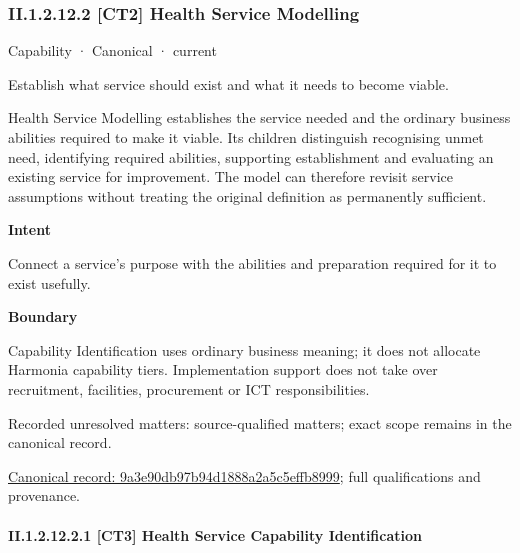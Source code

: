 \subsubsection*{II.1.2.12.2 [CT2] Health Service Modelling}
\label{navigation:II.1.2.12.2}

\label{element:9a3e90db97b94d1888a2a5c5effb8999}
{\small Capability · Canonical · current}\par

Establish what service should exist and what it needs to become viable.



Health Service Modelling establishes the service needed and the ordinary business abilities required to make it viable. Its children distinguish recognising unmet need, identifying required abilities, supporting establishment and evaluating an existing service for improvement. The model can therefore revisit service assumptions without treating the original definition as permanently sufficient.



\textbf{Intent}



Connect a service's purpose with the abilities and preparation required for it to exist usefully.



\textbf{Boundary}



Capability Identification uses ordinary business meaning; it does not allocate Harmonia capability tiers. Implementation support does not take over recruitment, facilities, procurement or ICT responsibilities.


{\small Recorded unresolved matters: source-qualified matters; exact scope remains in the canonical record.}\par
{\footnotesize \href{../../../../continuum/strategy/capability/9a3e90db97b94d1888a2a5c5effb8999.md}{Canonical record: 9a3e90db97b94d1888a2a5c5effb8999}; full qualifications and provenance.}\par
\paragraph*{II.1.2.12.2.1 [CT3] Health Service Capability Identification}
\label{navigation:II.1.2.12.2.1}

